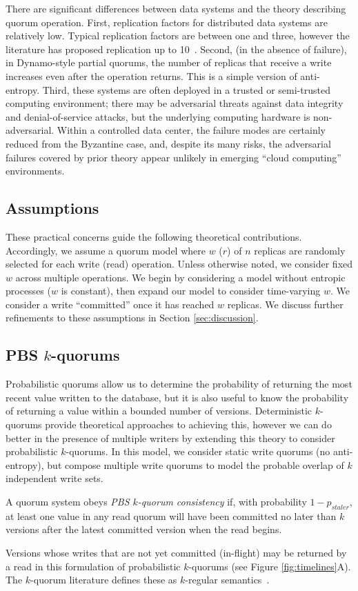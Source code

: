 \documentclass{vldb}
\begin{document}
There are significant differences between data systems and the theory
describing quorum operation.  First, replication factors for
distributed data systems are relatively low.  Typical replication
factors are between one and three, however the literature has proposed
replication up to 10~\cite{chain-replication}.  Second, (in the
absence of failure), in Dynamo-style partial quorums, the number of
replicas that receive a write increases even after the operation
returns.  This is a simple version of anti-entropy.  Third, these
systems are often deployed in a trusted or semi-trusted computing
environment; there may be adversarial threats against data integrity
and denial-of-service attacks, but the underlying computing hardware
is non-adversarial. Within a controlled data center, the failure modes
are certainly reduced from the Byzantine case, and, despite its many
risks, the adversarial failures covered by prior theory appear
unlikely in emerging ``cloud computing'' environments.

\subsection{Assumptions}

These practical concerns guide the following theoretical
contributions.  Accordingly, we assume a quorum model where $w$ ($r$)
of $n$ replicas are randomly selected for each write (read) operation.
Unless otherwise noted, we consider fixed $w$ across multiple
operations.  We begin by considering a model without entropic
processes ($w$ is constant), then expand our model to consider
time-varying $w$. We consider a write ``committed'' once it has
reached $w$ replicas. We discuss further refinements to these
assumptions in Section \ref{sec:discussion}.

\subsection{PBS $k$-quorums}

Probabilistic quorums allow us to determine the probability of
returning the most recent value written to the database, but it is
also useful to know the probability of returning a value within a
bounded number of versions.  Deterministic $k$-quorums provide
theoretical approaches to achieving this, however we can do better in
the presence of multiple writers by extending this theory to consider
probabilistic $k$-quorums.  In this model, we consider static write
quorums (no anti-entropy), but compose multiple write quorums to model the probable overlap of $k$ independent write sets.
\begin{definition}
A quorum system obeys \textit{PBS $k$-quorum consistency} if, with
probability $1-p_{staler}$, at least one value in any read quorum will
have been committed no later than $k$ versions after the latest committed
version when the read begins.
\end{definition}
Versions whose writes that are not yet committed (in-flight) may be
returned by a read in this formulation of probabilistic $k$-quorums
(see Figure \ref{fig:timelines}A).  The $k$-quorum literature defines these as $k$-regular semantics~\cite{nonstrict-availability}.
\end{document}
